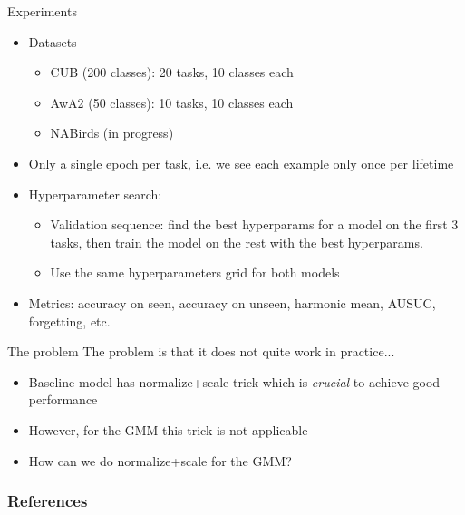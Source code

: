 \documentclass[10pt]{beamer}
\begin{document}
\begin{frame}{Experiments}

\begin{itemize}
    \item\pause Datasets
    \begin{itemize}
        \item CUB (200 classes): 20 tasks, 10 classes each
        \item AwA2 (50 classes): 10 tasks, 10 classes each
        \item NABirds (in progress)
    \end{itemize}
    \item\pause Only a single epoch per task, i.e. we see each example only once per lifetime
    \item\pause Hyperparameter search:
    \begin{itemize}
        \item Validation sequence: find the best hyperparams for a model on the first 3 tasks, then train the model on the rest with the best hyperparams.
        \item Use the same hyperparameters grid for both models
    \end{itemize}
    \item\pause Metrics: accuracy on seen, accuracy on unseen, harmonic mean, AUSUC, forgetting, etc.
\end{itemize}
\end{frame}

\begin{frame}{The problem}
The problem is that it does not quite work in practice...
\begin{itemize}
    \item Baseline model has normalize+scale trick which is \textit{crucial} to achieve good performance
    \item However, for the GMM this trick is not applicable
    \item How can we do normalize+scale for the GMM?
\end{itemize}
\end{frame}


\begin{frame}
    \frametitle{References}
    \printbibliography[heading=none]
\end{frame}
\end{document}
